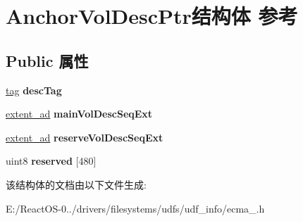 \hypertarget{struct_anchor_vol_desc_ptr}{}\section{Anchor\+Vol\+Desc\+Ptr结构体 参考}
\label{struct_anchor_vol_desc_ptr}
\subsection*{Public 属性}
\begin{DoxyCompactItemize}
\item 
\mbox{\label{struct_anchor_vol_desc_ptr_aadcc1530d34d9e19357172916de95d67}} 
\hyperlink{structtag}{tag} {\bfseries desc\+Tag}
\item 
\mbox{\label{struct_anchor_vol_desc_ptr_a67824fc21dbea91a2f08953b43bc5fa4}} 
\hyperlink{struct___e_x_t_e_n_t___a_d}{extent\+\_\+ad} {\bfseries main\+Vol\+Desc\+Seq\+Ext}
\item 
\mbox{\label{struct_anchor_vol_desc_ptr_a3c92e795e4e850a9fefcd1b1d15cf51c}} 
\hyperlink{struct___e_x_t_e_n_t___a_d}{extent\+\_\+ad} {\bfseries reserve\+Vol\+Desc\+Seq\+Ext}
\item 
\mbox{\label{struct_anchor_vol_desc_ptr_ab5e08799f8b413a79f9f5a720ec5ec67}} 
uint8 {\bfseries reserved} \mbox{[}480\mbox{]}
\end{DoxyCompactItemize}


该结构体的文档由以下文件生成\+:\begin{DoxyCompactItemize}
\item 
E\+:/\+React\+O\+S-\/0../drivers/filesystems/udfs/udf\+\_\+info/ecma\+\_.\+h\end{DoxyCompactItemize}
